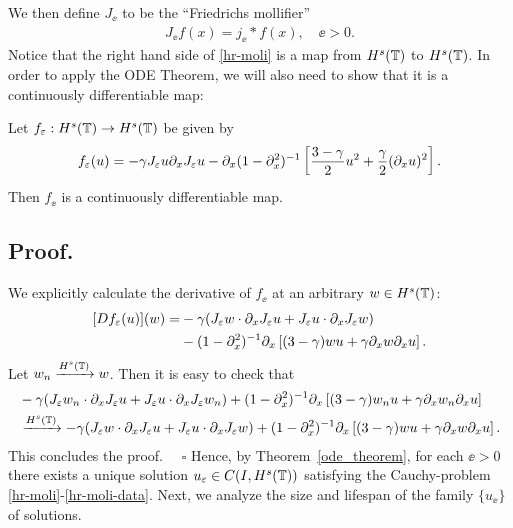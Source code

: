 We then define $J_\ee$ to be the ``Friedrichs mollifier''
\begin{equation}
\begin{split}
J_\ee f(x) = j_\ee * f(x), \quad \ee>0.
\end{split}
\end{equation}
%
%
Notice that the right hand side of \eqref{hr-moli} is a map from $H^s(\mathbb{T})$
to $H^s(\mathbb{T})$.  In order to apply the ODE Theorem, we will also need to
show that it is a continuously differentiable map:
%
%
%
\begin{lemma}
Let $f_\varepsilon:H^s(\mathbb{T}) \to H^s(\mathbb{T})$ be given by 
\begin{equation}
\label{f_ep}
f_{\varepsilon}(u) = -\gamma  J_\varepsilon u \partial_x J_\varepsilon u
- \partial_x (1-\partial_x^2)^{-1} \left
[\frac{3-\gamma}{2}u^2 + \frac{\gamma}{2}(\partial_x u)^2 \right ].
\end{equation}
Then $f_\ee$  is a continuously differentiable map.
\end{lemma}
%
%
\subsection{Proof.} We explicitly calculate the derivative of $f_\ee$ at an
arbitrary $w \in H^s(\mathbb{T})$:
\begin{equation*}
\begin{split}
[Df_{\varepsilon}(u)](w)
=
& -\gamma (J_\varepsilon w \cdot \partial_x J_\varepsilon u +
J_\varepsilon u \cdot \partial_x J_\varepsilon w)
\\
& - (1-\partial_x ^2)^{-1}
\partial_x \left [(3-\gamma)w u + \gamma\partial_x w \partial_x u \right ].
\end{split}
\end{equation*}
Let $w_n \xrightarrow{H^s(\mathbb{T})} w$. Then it is easy to check that
%
\begin{equation}
\begin{split}
& -\gamma (J_\varepsilon w_n \cdot \partial_x J_\varepsilon u 
+ J_\varepsilon u \cdot \partial_x J_\varepsilon w_n)
+ (1-\partial_x ^2)^{-1}
\partial_x \left [(3-\gamma)w_n u + \gamma\partial_x w_n \partial_x u \right ]
\\
& \xrightarrow{H^s(\mathbb{T})} 
-\gamma (J_\varepsilon w \cdot \partial_x J_\varepsilon u 
+ J_\varepsilon u \cdot \partial_x J_\varepsilon w) + (1-\partial_x ^2)^{-1}
\partial_x \left [(3-\gamma)w u + \gamma\partial_x w \partial_x u \right ].
\end{split}
\end{equation}
This concludes the proof. $\quad \square$
Hence, by Theorem~\ref{ode_theorem}, for each $\ee > 0$ there exists a
unique solution $u_\varepsilon \in C(I, H^s(\mathbb{T}))$ satisfying the Cauchy-problem
\eqref{hr-moli}-\eqref{hr-moli-data}. Next, we analyze the size and
lifespan of the family $\{u_\ee\}$ of solutions.
%
%
%
%
